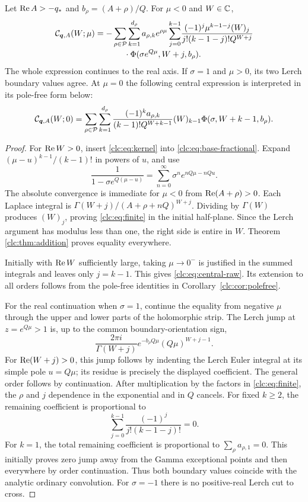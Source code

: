 \begin{theorem}
\label{clc:thm:finite}
Let $\operatorname{Re} A>-q_*$ and $b_\rho=(A+\rho)/Q$. For $\mu<0$ and $W\in\mathbb C$,
\begin{align}
 \CC_{\bq,A}(W;\mu)
 =-\sum_{\rho\in\PP}\sum_{k=1}^{d_\rho}a_{\rho,k}e^{\rho\mu}
 \sum_{j=0}^{k-1}
 &\frac{(-1)^j\mu^{k-1-j}(W)_j}
 {j!(k-1-j)!Q^{W+j}}\notag\\[-2pt]
 &\hspace{-24mm}\cdot\Phi(\sigma e^{Q\mu},W+j,b_\rho).
 \label{clc:eq:finite}
\end{align}
The whole expression continues to the real axis. If $\sigma=1$ and
$\mu>0$, its two Lerch boundary values agree. At $\mu=0$ the following
central expression is interpreted in its pole-free form below:
\begin{equation}\label{clc:eq:central-raw}
 \mathcal C_{\boldsymbol q,A}(W;0)=
 \sum_{\rho\in\mathcal P}\sum_{k=1}^{d_\rho}
 \frac{(-1)^ka_{\rho,k}}{(k-1)!Q^{W+k-1}}
 (W)_{k-1}\Phi(\sigma,W+k-1,b_\rho).
\end{equation}
\end{theorem}
\begin{proof}
For $\operatorname{Re} W>0$, insert \eqref{clc:eq:kernel} into
\eqref{clc:eq:base-fractional}. Expand
$(\mu-u)^{k-1}/(k-1)!$ in powers of $u$, and use
\[
 \frac1{1-\sigma e^{Q(\mu-u)}}
 =\sum_{n=0}^\infty\sigma^ne^{nQ\mu-nQu}.
\]
The absolute convergence is immediate for $\mu<0$ from
$\operatorname{Re}(A+\rho)>0$. Each Laplace integral is
$\Gamma(W+j)/(A+\rho+nQ)^{W+j}$.
Dividing by $\Gamma(W)$ produces $(W)_j$, proving
\eqref{clc:eq:finite} in the initial half-plane. Since the Lerch argument
has modulus less than one, the right side is entire in $W$. Theorem
\ref{clc:thm:addition} proves equality everywhere.

Initially with $\operatorname{Re} W$ sufficiently large, taking $\mu\to0^-$ is
justified in the summed integrals and leaves only $j=k-1$. This gives
\eqref{clc:eq:central-raw}. Its extension to all orders follows from
the pole-free identities in Corollary~\ref{clc:cor:polefree}.

For the real continuation when $\sigma=1$, continue the equality from
negative $\mu$ through the upper and lower parts of the holomorphic
strip. The Lerch jump at
$z=e^{Q\mu}>1$ is, up to the common boundary-orientation sign,
\[
 \frac{2\pi i}{\Gamma(W+j)}
 e^{-b_\rho Q\mu}(Q\mu)^{W+j-1}.
\]
For $\operatorname{Re}(W+j)>0$, this jump follows by indenting the Lerch Euler
integral at its simple pole $u=Q\mu$; its residue is precisely the
displayed coefficient. The general order follows by continuation.
After multiplication by the factors in \eqref{clc:eq:finite}, the
$\rho$ and $j$ dependence in the exponential and in $Q$ cancels.
For fixed $k\ge2$, the remaining coefficient is proportional to
\[
 \sum_{j=0}^{k-1}\frac{(-1)^j}{j!(k-1-j)!}=0.
\]
For $k=1$, the total remaining coefficient is proportional to
$\sum_\rho a_{\rho,1}=0$. This initially proves zero jump away from
the Gamma exceptional points and then everywhere by order continuation.
Thus both boundary values coincide with the analytic ordinary
convolution. For $\sigma=-1$ there is no positive-real Lerch cut to cross.
\end{proof}

